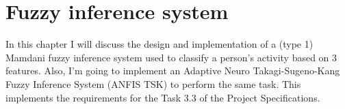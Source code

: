 \chapter{Fuzzy inference system}\label{ch:fuzzy}

In this chapter I will discuss the design and implementation of a (type 1)
Mamdani fuzzy inference system used to classify a person's activity based on 3
features. Also, I'm going to implement an Adaptive Neuro Takagi-Sugeno-Kang
Fuzzy Inference System (ANFIS TSK) to perform the same task. This implements
the requirements for the Task 3.3 of the Project Specifications.




